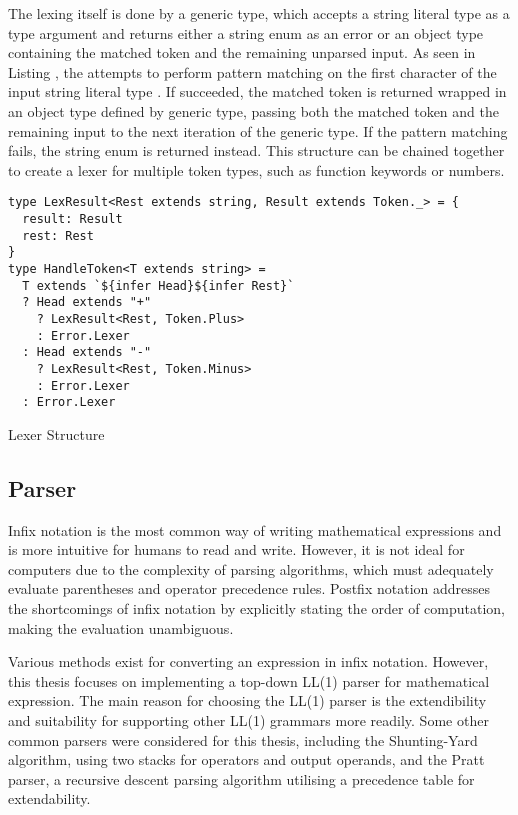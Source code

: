 The lexing itself is done by a generic type, which accepts a string literal type as a type argument and returns either a string enum as an error or an object type containing the matched token and the remaining unparsed input. As seen in Listing , the  attempts to perform pattern matching on the first character of the input string literal type . If succeeded, the matched token is returned wrapped in an object type defined by  generic type, passing both the matched token and the remaining input to the next iteration of the  generic type. If the pattern matching fails, the  string enum is returned instead. This structure can be chained together to create a lexer for multiple token types, such as function keywords or numbers.

\begin{listing}[ht]
  \begin{verbatim}
type LexResult<Rest extends string, Result extends Token._> = {
  result: Result
  rest: Rest
}
type HandleToken<T extends string> = 
  T extends `${infer Head}${infer Rest}`
  ? Head extends "+"
    ? LexResult<Rest, Token.Plus>
    : Error.Lexer
  : Head extends "-"
    ? LexResult<Rest, Token.Minus>
    : Error.Lexer
  : Error.Lexer
\end{verbatim}
  \caption{Lexer Structure}\label{lst:lexer-structure}
\end{listing}

\subsection{Parser}

Infix notation is the most common way of writing mathematical expressions and is more intuitive for humans to read and write. However, it is not ideal for computers due to the complexity of parsing algorithms, which must adequately evaluate parentheses and operator precedence rules. Postfix notation addresses the shortcomings of infix notation by explicitly stating the order of computation, making the evaluation unambiguous.

Various methods exist for converting an expression in infix notation. However, this thesis focuses on implementing a top-down LL(1) parser for mathematical expression. The main reason for choosing the LL(1) parser is the extendibility and suitability for supporting other LL(1) grammars more readily. Some other common parsers were considered for this thesis, including the Shunting-Yard algorithm, using two stacks for operators and output operands, and the Pratt parser, a recursive descent parsing algorithm utilising a precedence table for extendability.

